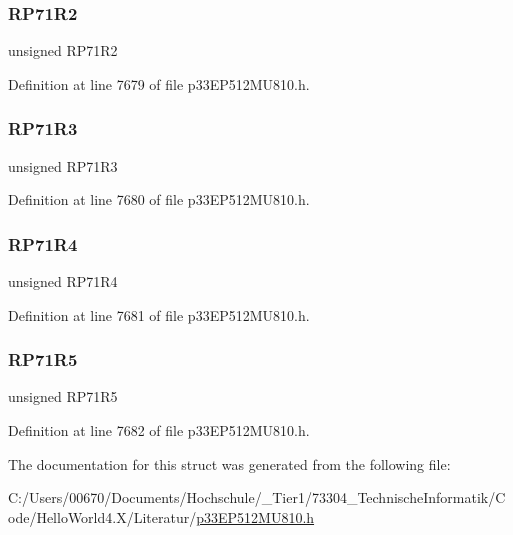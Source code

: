 \subsubsection{\texorpdfstring{R\+P71\+R2}{RP71R2}}
{\footnotesize\ttfamily unsigned R\+P71\+R2}



Definition at line 7679 of file p33\+E\+P512\+M\+U810.\+h.

\mbox{\label{structtag_r_p_o_r3_b_i_t_s_a7b92323b8b82e0880bf6a375ccaf8bfd}} 
\subsubsection{\texorpdfstring{R\+P71\+R3}{RP71R3}}
{\footnotesize\ttfamily unsigned R\+P71\+R3}



Definition at line 7680 of file p33\+E\+P512\+M\+U810.\+h.

\mbox{\label{structtag_r_p_o_r3_b_i_t_s_a9a0dddfe26c3e7b7aae233622ad62ad5}} 
\subsubsection{\texorpdfstring{R\+P71\+R4}{RP71R4}}
{\footnotesize\ttfamily unsigned R\+P71\+R4}



Definition at line 7681 of file p33\+E\+P512\+M\+U810.\+h.

\mbox{\label{structtag_r_p_o_r3_b_i_t_s_a765dd52331db196cd5be5f7ba40be832}} 
\subsubsection{\texorpdfstring{R\+P71\+R5}{RP71R5}}
{\footnotesize\ttfamily unsigned R\+P71\+R5}



Definition at line 7682 of file p33\+E\+P512\+M\+U810.\+h.



The documentation for this struct was generated from the following file\+:\begin{DoxyCompactItemize}
\item 
C\+:/\+Users/00670/\+Documents/\+Hochschule/\+\_\+\+Tier1/73304\+\_\+\+Technische\+Informatik/\+Code/\+Hello\+World4.\+X/\+Literatur/\hyperlink{p33_e_p512_m_u810_8h}{p33\+E\+P512\+M\+U810.\+h}\end{DoxyCompactItemize}
